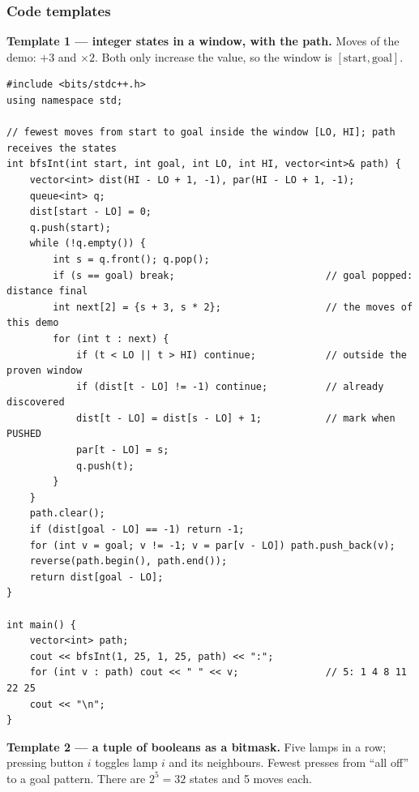 \subsubsection*{Code templates}

\textbf{Template 1 --- integer states in a window, with the path.} Moves of the demo: $+3$ and $\times2$. Both only increase the value, so the window is $[\text{start}, \text{goal}]$.

\begin{lstlisting}[style=cpp]
#include <bits/stdc++.h>
using namespace std;

// fewest moves from start to goal inside the window [LO, HI]; path receives the states
int bfsInt(int start, int goal, int LO, int HI, vector<int>& path) {
    vector<int> dist(HI - LO + 1, -1), par(HI - LO + 1, -1);
    queue<int> q;
    dist[start - LO] = 0;
    q.push(start);
    while (!q.empty()) {
        int s = q.front(); q.pop();
        if (s == goal) break;                          // goal popped: distance final
        int next[2] = {s + 3, s * 2};                  // the moves of this demo
        for (int t : next) {
            if (t < LO || t > HI) continue;            // outside the proven window
            if (dist[t - LO] != -1) continue;          // already discovered
            dist[t - LO] = dist[s - LO] + 1;           // mark when PUSHED
            par[t - LO] = s;
            q.push(t);
        }
    }
    path.clear();
    if (dist[goal - LO] == -1) return -1;
    for (int v = goal; v != -1; v = par[v - LO]) path.push_back(v);
    reverse(path.begin(), path.end());
    return dist[goal - LO];
}

int main() {
    vector<int> path;
    cout << bfsInt(1, 25, 1, 25, path) << ":";
    for (int v : path) cout << " " << v;               // 5: 1 4 8 11 22 25
    cout << "\n";
}
\end{lstlisting}

\textbf{Template 2 --- a tuple of booleans as a bitmask.} Five lamps in a row; pressing button $i$ toggles lamp $i$ and its neighbours. Fewest presses from ``all off'' to a goal pattern. There are $2^5 = 32$ states and 5 moves each.


